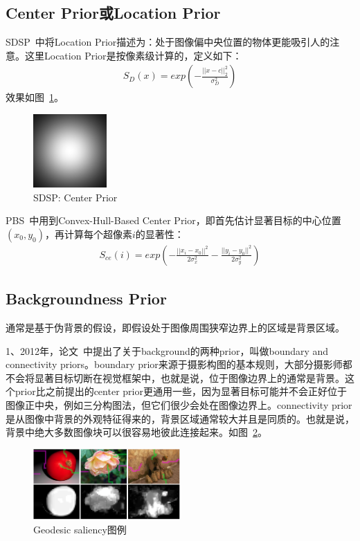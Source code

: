 \documentclass[12pt]{article}
\begin{document}
\subsection{Center Prior或Location Prior}

SDSP~\cite{zhang2013sdsp}中将Location Prior描述为：处于图像偏中央位置的物体更能吸引人的注意。这里Location Prior是按像素级计算的，定义如下：
\begin{align}
S_D(x) = exp\left(-\frac{||x-c||_2^2}{\sigma_D^2}\right)
\end{align}
效果如图~\ref{fig: SDSPCenterPrior}。
\begin{figure}[!ht]
\centering
\includegraphics[width=0.25\textwidth]{SDSPCenterPrior.png}
\caption{SDSP: Center Prior}
\label{fig: SDSPCenterPrior}
\end{figure} 

PBS~\cite{yang2013graph}中用到Convex-Hull-Based Center Prior，即首先估计显著目标的中心位置$(x_0, y_0)$，再计算每个超像素$i$的显著性：
\begin{align}
S_{ce}(i) = exp\left(-\frac{||x_i-x_0||^2}{2\sigma_x^2}-\frac{||y_i-y_0||^2}{2\sigma_y^2}\right)
\end{align}

\subsection{Backgroundness Prior}

通常是基于伪背景的假设，即假设处于图像周围狭窄边界上的区域是背景区域。

1、2012年，论文~\cite{wei2012geodesic}中提出了关于background的两种prior，叫做boundary and connectivity priors。boundary prior来源于摄影构图的基本规则，大部分摄影师都不会将显著目标切断在视觉框架中，也就是说，位于图像边界上的通常是背景。这个prior比之前提出的center prior更通用一些，因为显著目标可能并不会正好位于图像正中央，例如三分构图法，但它们很少会处在图像边界上。connectivity prior是从图像中背景的外观特征得来的，背景区域通常较大并且是同质的。也就是说，背景中绝大多数图像块可以很容易地彼此连接起来。如图~\ref{fig: GS}。
\begin{figure}[!ht]
\centering
\includegraphics[width=0.5\textwidth]{GS.png}
\caption{Geodesic saliency图例}
\label{fig: GS}
\end{figure} 
\end{document}

